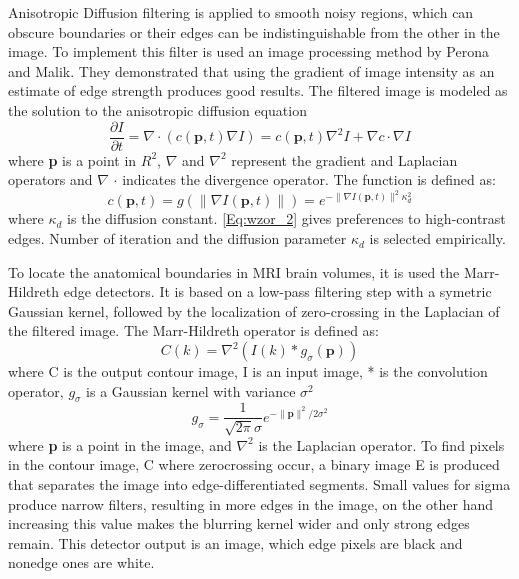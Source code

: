 Anisotropic Diffusion filtering is applied to smooth noisy regions, which can obscure boundaries or their edges can be indistinguishable from the other in the image. To implement this filter is used an image processing method by Perona and Malik. They demonstrated that using the gradient of image intensity as an estimate of edge strength produces good results. The filtered image is modeled as the solution to the anisotropic diffusion equation
\begin{equation}
    \frac{\partial I}{\partial t} = \nabla \cdot (c(\textbf{p},t)\nabla I) = c(\textbf{p},t)\nabla^{2}I + \nabla c \cdot \nabla I  \label{Eq:wzor_1}
\end{equation}
where \textbf{p} is a point in $R^{2}$, $\nabla$ and $\nabla^{2}$  represent the gradient and Laplacian operators and $\nabla$ $\cdot$ indicates the divergence operator. The function is defined as:
\begin{equation}
    c(\textbf{p},t) = g(\parallel\nabla I(\boldsymbol{p},t)\parallel) = e^{-\parallel\nabla I(\textbf{p},t)\parallel^{2} \kappa^{2}_{d}} \label{Eq:wzor_2}
\end{equation}
where $\kappa_{d}$ is the diffusion constant. \eqref{Eq:wzor_2} gives preferences to high-contrast edges. Number of iteration and the diffusion parameter $\kappa_{d}$ is selected empirically.

To locate the anatomical boundaries in MRI brain volumes, it is used the Marr-Hildreth edge detectors. It is based on a low-pass filtering step with a symetric Gaussian kernel, followed by the localization of zero-crossing in the Laplacian of the filtered image. The Marr-Hildreth operator is defined as:
\begin{equation}
    C(k) = \nabla^{2}(I(k)*g_{\sigma}(\textbf{p})) \label{Eq:wzor_3}
\end{equation}
where C is the output contour image, I is an input image, * is the convolution operator, $g_{\sigma}$ is a Gaussian kernel with variance $\sigma^{2}$
\begin{equation}
    g_{\sigma} = \frac{1}{\sqrt{2\pi}\sigma}e^{- \parallel\textbf{p}\parallel^{2}/2\sigma^{2}} \label{Eq:wzor_4}
\end{equation}
where \textbf{p} is a point in the image, and $\nabla^{2}$ is the Laplacian operator.
To find pixels in the contour image, C where zerocrossing occur, a binary image E is produced that separates the image into edge-differentiated segments. Small values for sigma produce narrow filters, resulting in more edges in the image, on the other hand increasing this value makes the blurring kernel wider and only strong edges remain. This detector output is an image, which edge pixels are black and nonedge ones are white.

